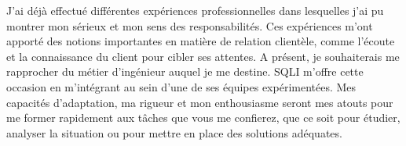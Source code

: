 \documentclass[11pt, a4paper]{awesome-cv}
\begin{document}
\begin{cvletter}
\vspace{2mm} 

J'ai déjà effectué différentes expériences professionnelles dans lesquelles j'ai pu montrer mon sérieux et mon sens des responsabilités. Ces expériences m'ont apporté des notions importantes en matière de relation clientèle, comme l'écoute et la connaissance du client pour cibler ses attentes. A présent, je souhaiterais me rapprocher du métier d'ingénieur auquel je me destine. SQLI m'offre cette occasion en m'intégrant au sein d'une de ses équipes expérimentées. Mes capacités d'adaptation, ma rigueur et mon enthousiasme seront mes atouts pour me former rapidement aux tâches que vous me confierez, que ce soit pour étudier, analyser la situation ou pour mettre en place des solutions adéquates.




\end{cvletter}


\makeletterclosing
\end{document}
